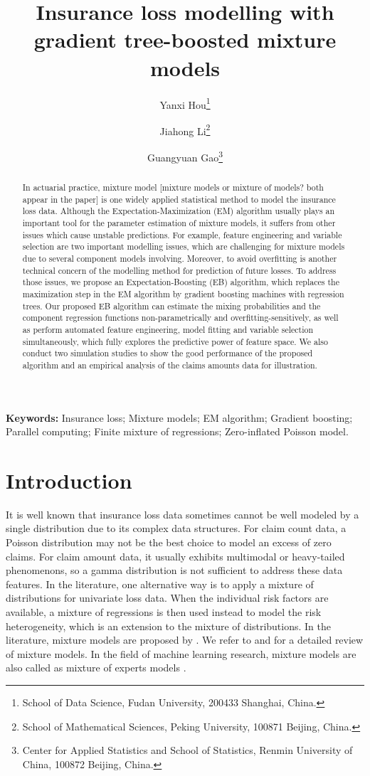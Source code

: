 \documentclass[11pt]{article}
\title{Insurance loss modelling with gradient tree-boosted mixture models}
\author{ Yanxi Hou\footnote{School of Data Science, Fudan University, 200433 Shanghai, China.} \and Jiahong Li\footnote{School of Mathematical Sciences, Peking University, 100871 Beijing, China.} \and Guangyuan Gao\footnote{Center for Applied Statistics and School of Statistics, Renmin University of China, 100872 Beijing, China.}}
\numberwithin{equation}{section}
\begin{document}
\maketitle

\begin{abstract}

In actuarial practice, mixture model {\color{blue}[mixture models or mixture of models? both appear in the paper]} is one widely applied statistical method to model the insurance loss data. 
Although the Expectation-Maximization (EM) algorithm usually plays an important tool for the parameter estimation of mixture  models, it suffers from other issues which cause unstable predictions. 
For example, feature engineering and variable selection are two important modelling issues, which are challenging for mixture models due to several component models involving. 
Moreover, to avoid overfitting is another technical concern of the modelling method for prediction of future losses. 
To address those issues, we propose an Expectation-Boosting (EB) algorithm, 
which replaces the maximization step in the EM algorithm by gradient boosting machines with regression trees. 
Our proposed EB algorithm can estimate the mixing probabilities and the component regression functions non-parametrically and overfitting-sensitively, as well as
perform automated feature engineering, model fitting and variable selection simultaneously, which
fully explores the predictive power of feature space.
We also conduct two simulation studies to show the good performance of the proposed algorithm and an empirical analysis of the claims amounts data for illustration. 

\end{abstract}

{\bf Keywords:} Insurance loss; Mixture models; EM algorithm; Gradient boosting; Parallel computing; Finite mixture of regressions; Zero-inflated Poisson model. 

\newpage
\section{Introduction}

It is well known that insurance loss data sometimes cannot be well modeled by a single distribution due to its complex data structures.
For claim count data, a Poisson distribution may not be the best choice to model an excess of zero claims.
For claim amount data, it usually exhibits multimodal or heavy-tailed phenomenons, so a gamma distribution is not sufficient to address these data features.
In the literature, one alternative way is to apply a mixture of distributions for univariate loss data.
When the individual risk factors are available, a mixture of regressions is then used instead to model the risk heterogeneity, which is an extension to the mixture of distributions. 
In the literature,
mixture models are proposed by \citet{goldfeld1973markov}.
We refer to \citet{lindsay1995mixture} and \citet{peel2000finite} for a detailed review of mixture models.
In the field of machine learning research, mixture models are also called as mixture of experts models \citep{jacobs1991adaptive,jiang1999hierarchical}.
\end{document}
